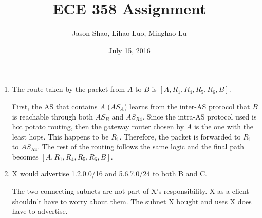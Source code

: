 \documentclass[12pt]{article}
\title{ECE 358 Assignment }
\author{Jason Shao, Lihao Luo, Minghao Lu}
\date{July 15, 2016}
\begin{document}
\maketitle
\renewcommand{\thesubsection}{Problem \arabic{subsection}}


\def\question#1{\item[\bf #1.]}
\def\part#1{\item[\bf #1)]}
\newcommand{\pc}[1]{\mbox{\textbf{#1}}} %

\begin{enumerate}
\item The route taken by the packet from $A$ to $B$ is $[A, R_1, R_4, R_5, R_6, B]$. 

First, the AS that contains $A$ ($AS_A$) learns from the inter-AS protocol that $B$ is reachable through both $AS_B$ and $AS_{R4}$. Since the intra-AS protocol used is hot potato routing, then the gateway router chosen by $A$ is the one with the least hops. This happens to be $R_1$. Therefore, the packet is forwarded to $R_1$ to $AS_{R4}$. The rest of the routing follows the same logic and the final path becomes $[A, R_1, R_4, R_5, R_6, B]$.

\item X would advertise 1.2.0.0/16 and 5.6.7.0/24 to both B and C.

The two connecting subnets are not part of X's responsibility. X as
a client shouldn't have to worry about them. The subnet X bought and uses X does have to advertise.


\end{enumerate}
\end{document}
